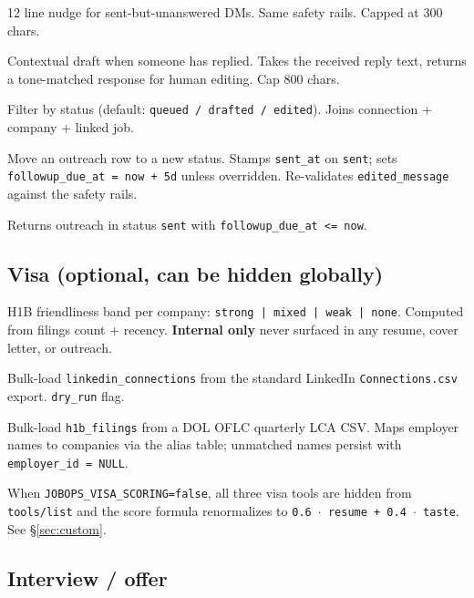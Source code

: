 \documentclass[11pt,letterpaper]{article}
\newcommand{\tool}[1]{\texttt{#1}}
\newcommand{\fpath}[1]{\texttt{#1}}
\newcommand{\env}[1]{\texttt{#1}}
\begin{document}
\begin{description}[leftmargin=0pt]
\item[\tool{draft\_followup}] 1\textendash{}2 line nudge for sent-but-unanswered DMs. Same safety rails. Capped at 300 chars.
\item[\tool{draft\_reply}] Contextual draft when someone has replied. Takes the received reply text, returns a tone-matched response for human editing. Cap 800 chars.
\item[\tool{get\_outreach\_queue}] Filter by status (default: \texttt{queued / drafted / edited}). Joins connection + company + linked job.
\item[\tool{update\_outreach}] Move an outreach row to a new status. Stamps \texttt{sent\_at} on \texttt{sent}; sets \texttt{followup\_due\_at = now + 5d} unless overridden. Re-validates \texttt{edited\_message} against the safety rails.
\item[\tool{get\_followups\_due}] Returns outreach in status \texttt{sent} with \texttt{followup\_due\_at <= now}.
\end{description}

\subsection*{Visa (optional, can be hidden globally)}

\begin{description}[leftmargin=0pt]
\item[\tool{visa\_signal}] H1B friendliness band per company: \texttt{strong | mixed | weak | none}. Computed from filings count + recency. \textbf{Internal only} \textemdash{} never surfaced in any resume, cover letter, or outreach.
\item[\tool{import\_linkedin}] Bulk-load \fpath{linkedin\_connections} from the standard LinkedIn \fpath{Connections.csv} export. \texttt{dry\_run} flag.
\item[\tool{import\_h1b}] Bulk-load \fpath{h1b\_filings} from a DOL OFLC quarterly LCA CSV. Maps employer names to companies via the alias table; unmatched names persist with \texttt{employer\_id = NULL}.
\end{description}

\begin{notebox}
When \env{JOBOPS\_VISA\_SCORING=false}, all three visa tools are hidden from \texttt{tools/list} and the score formula renormalizes to \texttt{0.6 \(\cdot\) resume + 0.4 \(\cdot\) taste}. See \S\ref{sec:custom}.
\end{notebox}

\subsection*{Interview / offer}
\end{document}
